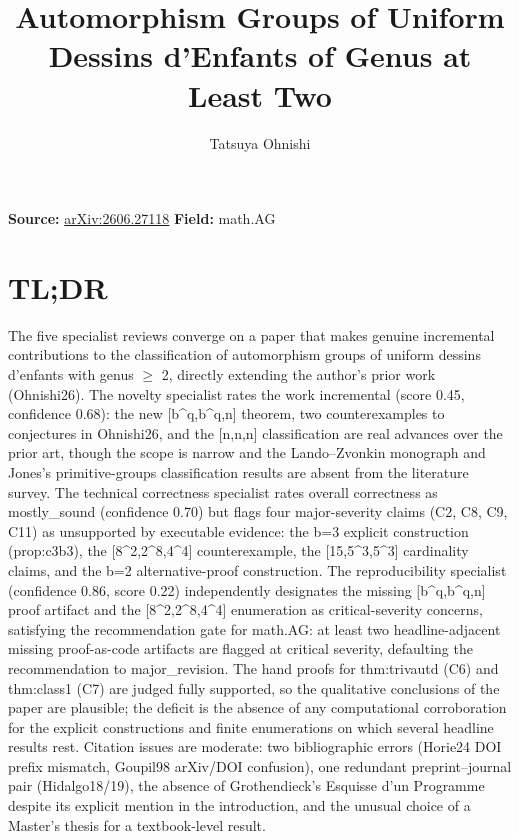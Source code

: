 \documentclass[11pt]{article}
\title{Automorphism Groups of Uniform Dessins d'Enfants of Genus at Least Two}
\author{Tatsuya Ohnishi}
\date{}
\begin{document}
\maketitle

\noindent\textbf{Source:} \href{https://arxiv.org/abs/2606.27118}{arXiv:2606.27118} \quad \textbf{Field:} math.AG\\

\section*{TL;DR}
The five specialist reviews converge on a paper that makes genuine incremental contributions to the classification of automorphism groups of uniform dessins d'enfants with genus \ensuremath{\ge} 2, directly extending the author's prior work (Ohnishi26). The novelty specialist rates the work incremental (score 0.45, confidence 0.68): the new [b\^{}q,b\^{}q,n] theorem, two counterexamples to conjectures in Ohnishi26, and the [n,n,n] classification are real advances over the prior art, though the scope is narrow and the Lando--Zvonkin monograph and Jones's primitive-groups classification results are absent from the literature survey. The technical correctness specialist rates overall correctness as mostly\_sound (confidence 0.70) but flags four major-severity claims (C2, C8, C9, C11) as unsupported by executable evidence: the b=3 explicit construction (prop:c3b3), the [8\^{}2,2\^{}8,4\^{}4] counterexample, the [15,5\^{}3,5\^{}3] cardinality claims, and the b=2 alternative-proof construction. The reproducibility specialist (confidence 0.86, score 0.22) independently designates the missing [b\^{}q,b\^{}q,n] proof artifact and the [8\^{}2,2\^{}8,4\^{}4] enumeration as critical-severity concerns, satisfying the recommendation gate for math.AG: at least two headline-adjacent missing proof-as-code artifacts are flagged at critical severity, defaulting the recommendation to major\_revision. The hand proofs for thm:trivautd (C6) and thm:class1 (C7) are judged fully supported, so the qualitative conclusions of the paper are plausible; the deficit is the absence of any computational corroboration for the explicit constructions and finite enumerations on which several headline results rest. Citation issues are moderate: two bibliographic errors (Horie24 DOI prefix mismatch, Goupil98 arXiv/DOI confusion), one redundant preprint--journal pair (Hidalgo18/19), the absence of Grothendieck's Esquisse d'un Programme despite its explicit mention in the introduction, and the unusual choice of a Master's thesis for a textbook-level result.
\end{document}
